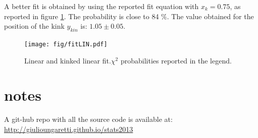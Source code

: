 \documentclass[twocolumn]{article}
\begin{document}
A better fit is obtained by using the reported fit equation with $x_k =0.75$, as reported in figure \ref{fig:fitLIN}. The probability is close to 84 $\%$.
The value obtained for the position of the kink $y_{kin}$ is: $1.05 \pm 0.05$.
\begin{figure}[h!]
	\begin{center}
		\texttt{[image: fig/fitLIN.pdf]}
	\end{center}
	\caption{Linear and kinked linear fit.$\chi ^2$ probabilities reported in the legend.}
	\label{fig:fitLIN}
\end{figure}



\section{notes}
A git-hub repo with all the source code is available at:
\url{http://giulioungaretti.github.io/stats2013}
\end{document}
